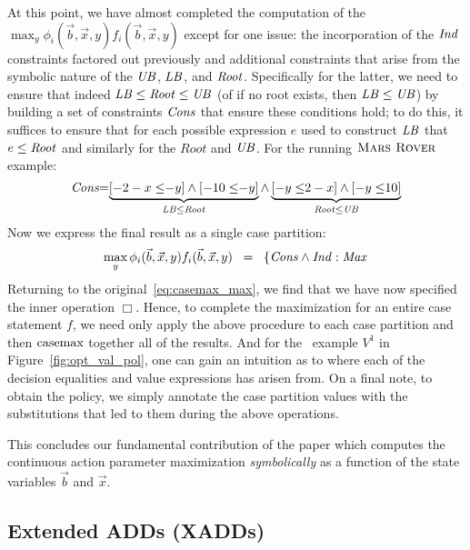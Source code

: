 At this point, we have almost completed the computation
of the $\max_y \phi_i(\vec{b},\vec{x},y) f_i(\vec{b},\vec{x},y)$
except for one issue: the incorporation of the $\mathit{Ind}$ constraints
factored out previously and additional constraints that arise from the
symbolic nature of the $\mathit{UB}$, $\mathit{LB}$, and $\mathit{Root}$.  Specifically
for the latter, we need to ensure that indeed $\mathit{LB} \leq \mathit{Root} \leq \mathit{UB}$
(of if no root exists, then $\mathit{LB} \leq \mathit{UB}$) by building a set
of constraints $\mathit{Cons}$ that ensure these conditions hold; to do this,
it suffices to ensure that for each possible expression $e$ used to
construct $\mathit{LB}$ that $e \leq \mathit{Root}$ and similarly for the $Root$ and $\mathit{UB}$.
For the running $\textsc{Mars Rover}$ example:
{\footnotesize 
\begin{equation*}
\mathit{Cons} \hspace{-1mm} = \hspace{-1mm} \underbrace{[-2 - x \leq \hspace{-1mm} -y] \land [-10 \leq \hspace{-1mm} -y]}_{\mathit{LB} \leq \mathit{Root}} \land \underbrace{[-y \leq \hspace{-1mm} 2 - x] \land [-y \leq \hspace{-1mm} 10]}_{\mathit{Root} \leq \mathit{UB}} 
\end{equation*}}
Now we express the final result as a single case partition:
\begin{equation*}
\max_y \phi_i(\vec{b},\vec{x},y) f_i(\vec{b},\vec{x},y) \;\; = \;\;
\left\{ \mathit{Cons} \land \mathit{Ind}: \mathit{Max} \right.
\end{equation*}
Returning to the original~\eqref{eq:casemax_max}, we find that
we have now specified the inner operation $\Box$.  Hence, to complete
the maximization for an entire case statement $f$, we need only
apply the above procedure to each case partition and then $\mathrm{casemax}$
together all of the results.  And for the \MarsRover\ example $V^1$ in
Figure~\ref{fig:opt_val_pol}, one can gain an intuition as to
where each of the decision equalities and value expressions has
arisen from.  On a final note, to obtain the policy, we simply
annotate the case partition values with the substitutions that led
to them during the above operations.

This concludes our fundamental contribution of the paper which
computes the continuous action parameter maximization \emph{symbolically}
as a function of the state variables $\vec{b}$ and $\vec{x}$.

\subsection{Extended ADDs (XADDs)}


